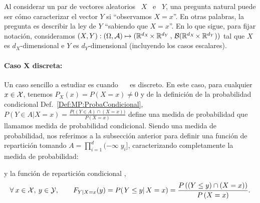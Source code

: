 \label{Sec:MP:LeyesCondicionales}

Al  considerar un  par de  vectores aleatorios  \ $X$  \ e  \ $Y$,  una pregunta
natural puede ser  c\'omo caracterizar el vector $Y$ si  ``observamos $X = x$''.
En otras palabras,  la pregunta es describir la ley  de $Y$ ``sabiendo   que  $X  =  x$''.   En  lo que  sigue,  para  fijar  notaci\'on,
consideramos $(X,Y): (  \Omega , \mathcal{A}) \mapsto (\mathbb{R}^{d_X}  \! \times \mathbb{R}^{d_Y}
\,   ,  \,  \mathcal{B}(\mathbb{R}^{d_X}   \!   \times   \mathbb{R}^{d_Y})  )$   tal  que   $X$  es
$d_X$-dimensional   e   $Y$   es   $d_Y$-dimensional   (incluyendo   los   casos
escalares).  



\paragraph{Caso $\boldsymbol{X}$ discreta:}
Un caso  sencillo a estudiar  es cuando \  \modif{$\X$} \ es discreto.   En este
caso, para  cualquier $x  \in \mathcal{X}$, tenemos  $P_X(x) = P(X  = x)  \ne 0$ y  de la
definici\'on de  la probabilidad condicional Def.~\ref{Def:MP:ProbaCondicional},
$\displaystyle P(Y \in A | X = x) = \frac{P\big( (Y \in A) \cap (X = x) \big)}{P(X=x)}$ define
una medida de probabilidad que llamamos medida de probabilidad condicional.
%
Siendo una medida de probabilidad, nos referimos a la subsecci\'on anterior para
definir una funci\'on de  repartici\'on tomando $\displaystyle A = \prod_{i=1}^d
(-\infty \; y_i]$, caracterizando completamente la medida de probabilidad:
%
\begin{definicion}\label{Def:MP:ReparticionCondicionalDiscreta}
%
  y la funci\'on de repartici\'on condicional ,
  \[
  \forall \:  x \in  \mathcal{X}, \: y  \in \mathcal{Y}, \qquad  F_{Y|X=x}(y) =  P( \left. Y  \le y
  \right| X = x ) = \frac{P\left(  \left(Y \le y \right) \cap \left(X = x\right)
    \right)}{P\left(X = x\right)}.
  \]
\end{definicion}


